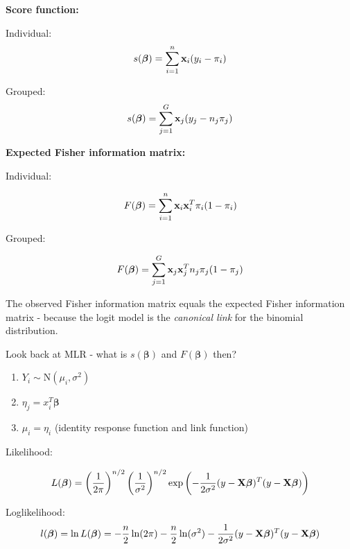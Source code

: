 \documentclass[
  ignorenonframetext,
]{beamer}
\begin{document}
\begin{frame}
\textbf{Score function:}

Individual: \[s(\boldsymbol{\beta})=\sum_{i=1}^n {\bf x}_i (y_i-\pi_i)\]

Grouped: \[s(\boldsymbol{\beta})=\sum_{j=1}^G {\bf x}_j (y_j-n_j\pi_j)\]
\end{frame}

\begin{frame}
\textbf{Expected Fisher information matrix:}

Individual:

\[F(\boldsymbol{\beta})=\sum_{i=1}^n {\bf x}_i {\bf x}_i^T\pi_i (1-\pi_i)\]

Grouped:

\[F(\boldsymbol{\beta})=\sum_{j=1}^G {\bf x}_j {\bf x}_j^T n_j \pi_j (1-\pi_j)\]

The observed Fisher information matrix equals the expected Fisher
information matrix - because the logit model is the \emph{canonical
link} for the binomial distribution.
\end{frame}

\begin{frame}
\begin{block}{Look back at MLR - what is \(s(\boldsymbol{\beta})\) and
\(F(\boldsymbol{\beta})\) then?}
\protect\hypertarget{look-back-at-mlr---what-is-sboldsymbolbeta-and-fboldsymbolbeta-then}{}
\begin{enumerate}
\item
  \(Y_i \sim \text{N}(\mu_i, \sigma^2)\)
\item
  \(\eta_j = x_i^T\boldsymbol{\beta}\)
\item
  \(\mu_i = \eta_i\) (identity response function and link function)
\end{enumerate}

Likelihood:

\[L(\boldsymbol{\beta}) = \left(\frac{1}{2\pi}\right)^{n/2}\left(\frac{1}{\sigma^2}\right)^{n/2} \exp\left(-\frac{1}{2\sigma^2}(y-{\bf X}\boldsymbol{\beta})^T(y-{\bf X}\boldsymbol{\beta})\right)\]

Loglikelihood:
\[l(\boldsymbol{\beta}) = \ln L(\boldsymbol{\beta}) = -\frac{n}{2} \ln (2\pi) - \frac{n}{2} \ln (\sigma^2) - \frac{1}{2\sigma^2}(y-{\bf X}\boldsymbol{\beta})^T(y-{\bf X}\boldsymbol{\beta})\]
\end{block}
\end{frame}
\end{document}
